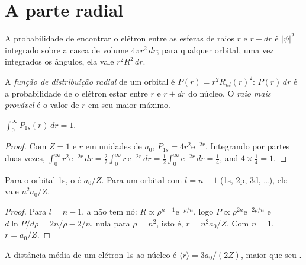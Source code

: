 \section{A parte radial}

A probabilidade de encontrar o elétron entre as esferas de raios $r$ e $r +
dr$ é $|\psi|^2$ integrado sobre a casca de volume $4\pi r^2\,dr$; para qualquer
orbital, uma vez integrados os ângulos, ela vale $r^2R^2\,dr$.

\begin{definition}\label{def:b2:atomic-orbitals:radial-distribution}
A \emph{função de distribuição radial} de
um orbital é $P(r) = r^2R_{nl}(r)^2$: $P(r)\,dr$ é a probabilidade de o
elétron estar entre $r$ e $r + dr$ do núcleo. O \emph{raio mais
provável} é o valor de $r$ em seu maior máximo.
\end{definition}

\begin{proposition}[Normalização do 1s]\label{prop:b2:atomic-orbitals:normalised}
$\int_0^\infty P_{1s}(r)\,dr = 1$.
\end{proposition}

\begin{proof}
Com $Z = 1$ e $r$ em unidades de $a_0$, $P_{1s} = 4r^2\mathrm e^{-2r}$. Integrando por partes duas vezes,
$\int_0^\infty r^2\mathrm e^{-2r}\,dr = \frac22\int_0^\infty r\,\mathrm e^{-2r}\,dr =
\frac12\int_0^\infty\mathrm e^{-2r}\,dr = \frac14$, and $4 \times \frac14 = 1$.
\end{proof}

\begin{proposition}\label{prop:b2:atomic-orbitals:most-probable}
Para o orbital 1s, o  é $a_0/Z$. Para um orbital com $l =
n - 1$ (1s, 2p, 3d, \dots), ele vale $n^2a_0/Z$.
\end{proposition}

\begin{proof}
Para $l = n - 1$, a  não tem nó: $R \propto \rho^{n-1}\mathrm e^{-\rho/n}$,
logo $P \propto \rho^{2n}\mathrm e^{-2\rho/n}$ e $d\ln P/d\rho = 2n/\rho - 2/n$, nula
para $\rho = n^2$, isto é, $r = n^2a_0/Z$. Com $n = 1$, $r = a_0/Z$.
\end{proof}

\begin{proposition}\label{prop:b2:atomic-orbitals:mean-radius}
A distância média de um elétron 1s ao núcleo é $\langle r\rangle = 3a_0/(2Z)$,
maior que seu .
\end{proposition}

